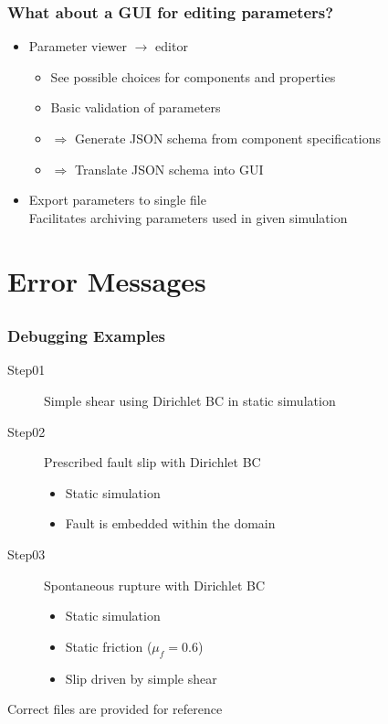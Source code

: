 \documentclass{beamer}
\begin{document}
\begin{frame}
  \frametitle{What about a GUI for editing parameters?}

  \begin{itemize}
  \item Parameter viewer $\rightarrow$ editor
    \begin{itemize}
    \item See possible choices for components and properties
    \item Basic validation of parameters
    \item $\Rightarrow$ Generate JSON schema from component
      specifications
    \item $\Rightarrow$ Translate JSON schema into GUI
    \end{itemize}
  \item Export parameters to single file\\
    Facilitates archiving parameters used in given simulation
  \end{itemize}

\end{frame}


\section{Error Messages}
\subsection{}

\begin{frame}
  \frametitle{Debugging Examples}

  \begin{description}
  \item[Step01] Simple shear using Dirichlet BC in static simulation
  \item[Step02] Prescribed fault slip with Dirichlet BC
    \begin{itemize}
    \item Static simulation
    \item Fault is embedded within the domain
    \end{itemize}
  \item[Step03] Spontaneous rupture with Dirichlet BC
    \begin{itemize}
    \item Static simulation
    \item Static friction ($\mu_f=0.6$)
    \item Slip driven by simple shear
    \end{itemize}
  \end{description}
  \vfill
  Correct files are provided for reference
  
\end{frame}
\end{document}
